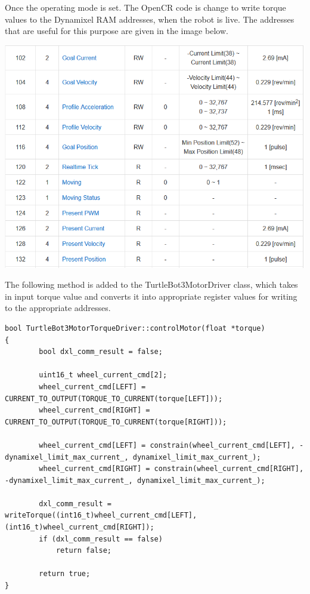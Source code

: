 \documentclass[12]{article}
\begin{document}
Once the operating mode is set. The OpenCR code is change to write torque values to the Dynamixel RAM addresses, when the robot is live. The addresses that are useful for this purpose are given in the image below.

\begin{center}
	\includegraphics[width=\linewidth]{images/dxl_control_table.png}\\
\end{center}

The following method is added to the TurtleBot3MotorDriver class, which takes in input torque value and converts it into appropriate register values for writing to the appropriate addresses.

\begin{lstlisting}
bool TurtleBot3MotorTorqueDriver::controlMotor(float *torque)
{
        bool dxl_comm_result = false;

        uint16_t wheel_current_cmd[2];
        wheel_current_cmd[LEFT] = CURRENT_TO_OUTPUT(TORQUE_TO_CURRENT(torque[LEFT]));
        wheel_current_cmd[RIGHT] = CURRENT_TO_OUTPUT(TORQUE_TO_CURRENT(torque[RIGHT]));

        wheel_current_cmd[LEFT] = constrain(wheel_current_cmd[LEFT], -dynamixel_limit_max_current_, dynamixel_limit_max_current_);
        wheel_current_cmd[RIGHT] = constrain(wheel_current_cmd[RIGHT], -dynamixel_limit_max_current_, dynamixel_limit_max_current_);

        dxl_comm_result = writeTorque((int16_t)wheel_current_cmd[LEFT], (int16_t)wheel_current_cmd[RIGHT]);
        if (dxl_comm_result == false)
            return false;

        return true;
}
\end{lstlisting}
\end{document}
